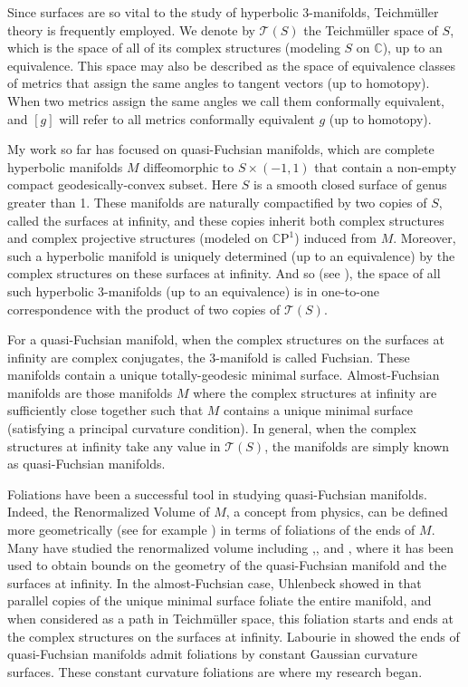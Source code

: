 \documentclass[11pt]{amsart}
\newcommand{\C}{\mathbb{C}}
\newcommand{\CP}{\mathbb{C}\mathrm{P}}
\begin{document}
Since surfaces are so vital to the study of hyperbolic 3-manifolds, Teichm\"uller theory is frequently employed. 
We denote by $\mathcal{T}(S)$ the Teichm\"uller space of $S$, which is the space of all of its complex structures (modeling $S$ on $\C$), up to an equivalence. 
This space may also be described as the space of equivalence classes of metrics that assign the same angles to tangent vectors (up to homotopy). 
When two metrics assign the same angles we call them conformally equivalent, and $[g]$ will refer to all metrics conformally equivalent $g$ (up to homotopy).


My work so far has focused on quasi-Fuchsian manifolds, which are complete hyperbolic manifolds $M$ diffeomorphic to $S \times (-1,1)$ that contain a non-empty compact geodesically-convex subset. 
Here $S$ is a smooth closed surface of genus greater than 1. 
These manifolds are naturally compactified by two copies of $S$, called the surfaces at infinity, and these copies inherit both complex structures and complex projective structures (modeled on $\CP^1$) induced from $M$. 
Moreover, such a hyperbolic manifold is uniquely determined (up to an equivalence) by the complex structures on these surfaces at infinity. 
And so (see \cite{bers1960}), the space of all such hyperbolic 3-manifolds (up to an equivalence) is in one-to-one correspondence with the product of two copies of $\mathcal{T}(S)$.


For a quasi-Fuchsian manifold, when the complex structures on the surfaces at infinity are complex conjugates, the 3-manifold is called Fuchsian. 
These manifolds contain a unique totally-geodesic minimal surface. 
Almost-Fuchsian manifolds are those manifolds $M$ where the complex structures at infinity are sufficiently close together such that $M$ contains a unique minimal surface (satisfying a principal curvature condition). 
In general, when the complex structures at infinity take any value in $\mathcal{T}(S)$, the manifolds are simply known as quasi-Fuchsian manifolds. 

Foliations have been a successful tool in studying quasi-Fuchsian manifolds.
Indeed, the Renormalized Volume of $M$, a concept from physics, can be defined more geometrically (see for example \cite{krasnov-schlenker2008}) in terms of foliations of the ends of $M$. 
Many have studied the renormalized volume including \cite{schlenker2013},\cite{ciobotaru-moroianu2016}, and \cite{bridgeman-brock-bromberg2019}, where it has been used to obtain bounds on the geometry of the quasi-Fuchsian manifold and the surfaces at infinity. 
In the almost-Fuchsian case, Uhlenbeck showed in \cite{uhlenbeck1983} that parallel copies of the unique minimal surface foliate the entire manifold, and when considered as a path in Teichm\"uller space, this foliation starts and ends at the complex structures on the surfaces at infinity. 
Labourie in \cite{labourie1991} showed the ends of quasi-Fuchsian manifolds admit foliations by constant Gaussian curvature surfaces. 
These constant curvature foliations are where my research began.
\end{document}
